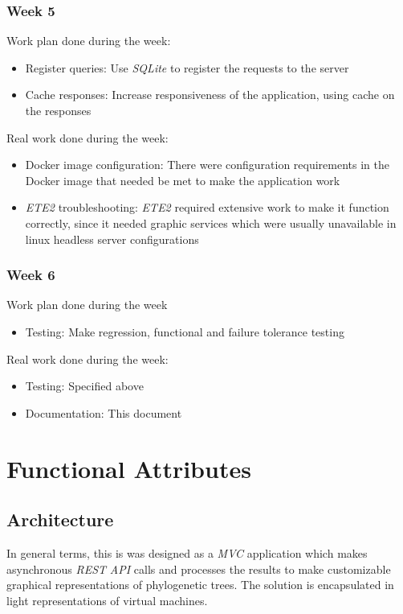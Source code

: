 \documentclass[10pt]{article}
\begin{document}
  \subsubsection{Week 5}
  	Work plan done during the week:
  	\begin{itemize}
  		\item Register queries: Use \textit{SQLite} to register the requests to the server
  		\item Cache responses: Increase responsiveness of the application, using cache on the responses
	\end{itemize}
	Real work done during the week:
	\begin{itemize}
		\item Docker image configuration: There were configuration requirements in the Docker image that needed be met to make the application work
		\item \textit{ETE2} troubleshooting: \textit{ETE2} required extensive work to make it function correctly, since it needed graphic services which were usually unavailable in linux headless server configurations
	\end{itemize}
  \subsubsection{Week 6}
  	Work plan done during the week
  	\begin{itemize}
  		\item Testing: Make regression, functional and failure tolerance testing
	\end{itemize}
	Real work done during the week:
	\begin{itemize}
		\item Testing: Specified above
		\item Documentation: This document
	\end{itemize}

\section{Functional Attributes}
 \subsection{Architecture}
 In general terms, this is was designed as a \textit{MVC} application which makes asynchronous \textit{REST} \textit{API} calls and processes the results to make customizable graphical representations of phylogenetic trees. The solution is encapsulated in light representations of virtual machines.
 
\end{document}
